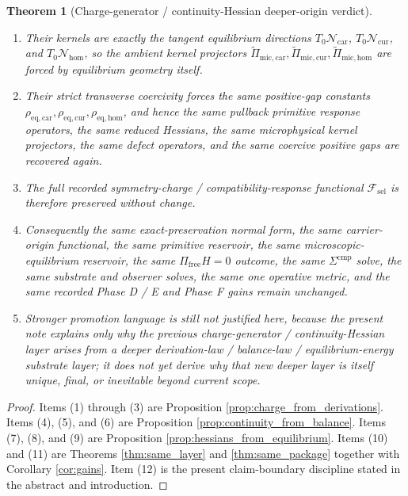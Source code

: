 \documentclass[11pt]{article}
\newcommand{\StemFunctional}{\mathscr F_{\mathrm{sel}}}
\newcommand{\TensorEqKerProj}{\widetilde\Pi_{\mathrm{mic,car}}}
\newcommand{\CurEqKerProj}{\widetilde\Pi_{\mathrm{mic,cur}}}
\newcommand{\HomEqKerProj}{\widetilde\Pi_{\mathrm{mic,hom}}}
\newcommand{\EqCarGap}{\rho_{\mathrm{eq,car}}}
\newcommand{\EqCurGap}{\rho_{\mathrm{eq,cur}}}
\newcommand{\EqHomGap}{\rho_{\mathrm{eq,hom}}}
\newcommand{\TensorEqManifold}{\mathcal N_{\mathrm{car}}}
\newcommand{\CurEqManifold}{\mathcal N_{\mathrm{cur}}}
\newcommand{\HomEqManifold}{\mathcal N_{\mathrm{hom}}}
\newtheorem{theorem}{Theorem}
\begin{document}
\begin{theorem}[Charge-generator / continuity-Hessian deeper-origin verdict]
\begin{enumerate}
    \item Their kernels are exactly the tangent equilibrium directions \(T_0\TensorEqManifold\), \(T_0\CurEqManifold\), and \(T_0\HomEqManifold\), so the ambient kernel projectors \(\TensorEqKerProj,\CurEqKerProj,\HomEqKerProj\) are forced by equilibrium geometry itself.
    \item Their strict transverse coercivity forces the same positive-gap constants \(\EqCarGap,\EqCurGap,\EqHomGap\), and hence the same pullback primitive response operators, the same reduced Hessians, the same microphysical kernel projectors, the same defect operators, and the same coercive positive gaps are recovered again.
    \item The full recorded symmetry-charge / compatibility-response functional \(\StemFunctional\) is therefore preserved without change.
    \item Consequently the same exact-preservation normal form, the same carrier-origin functional, the same primitive reservoir, the same microscopic-equilibrium reservoir, the same \(\Pi_{\mathrm{free}}H=0\) outcome, the same \(\Sigma^{\mathrm{cmp}}\) solve, the same substrate and observer solves, the same one operative metric, and the same recorded Phase D / E and Phase F gains remain unchanged.
    \item Stronger promotion language is still not justified here, because the present note explains only why the previous charge-generator / continuity-Hessian layer arises from a deeper derivation-law / balance-law / equilibrium-energy substrate layer; it does not yet derive why that new deeper layer is itself unique, final, or inevitable beyond current scope.
\end{enumerate}
\end{theorem}

\begin{proof}
Items (1) through (3) are Proposition \ref{prop:charge_from_derivations}. Items (4), (5), and (6) are Proposition \ref{prop:continuity_from_balance}. Items (7), (8), and (9) are Proposition \ref{prop:hessians_from_equilibrium}. Items (10) and (11) are Theorems \ref{thm:same_layer} and \ref{thm:same_package} together with Corollary \ref{cor:gains}. Item (12) is the present claim-boundary discipline stated in the abstract and introduction.
\end{proof}
\end{document}
